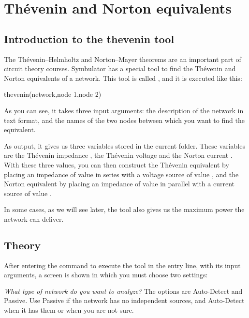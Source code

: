 
\chapter{Th\'evenin and Norton equivalents}

\section{Introduction to the thevenin tool}

The Th\'evenin--Helmholtz and Norton--Mayer theorems are an
important part of circuit theory courses. Symbulator has a special
tool to find the Th\'evenin and Norton equivalents of a network.
This tool is called , and it is executed like this:

\begin{entry}
thevenin(network,node 1,node 2)
\end{entry}

As you can see, it takes three input arguments: the description of
the network in text format, and the names of the two nodes between
which you want to find the equivalent.

As output, it gives us three variables stored in the current folder.
These variables are the Th\'evenin impedance , the
Th\'evenin voltage  and the Norton current .
With these three values, you can then construct the Th\'evenin
equivalent by placing an impedance of value  in series
with a voltage source of value , and the Norton equivalent
by placing an impedance of value  in parallel with a
current source of value .

In some cases, as we will see later, the tool also gives us the
maximum power the network can deliver.

\section{Theory}

After entering the command to execute the tool in the entry line,
with its input arguments, a screen is shown in which you must choose
two settings:

\emph{What type of network do you want to analyze?} The options are
Auto-Detect and Passive. Use Passive if the network has no
independent sources, and Auto-Detect when it has them or when you
are not sure.

